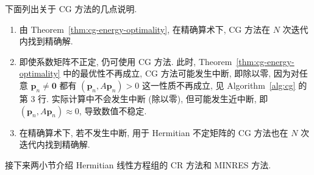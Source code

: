 {下面列出关于 CG 方法的几点说明.}
\begin{enumerate}
\item {由 Theorem\ \ref{thm:cg-energy-optimality}, 在精确算术下, CG 方法在 $N$ 次迭代内找到精确解.}
\item {即使系数矩阵不正定, 仍可使用 CG 方法. 此时, Theorem\ \ref{thm:cg-energy-optimality} 中的最优性不再成立, CG 方法可能发生中断, 即除以零, 因为对任意 $\bm p_n\ne\bm0$ 都有 $(\bm p_n,A\bm p_n)>0$ 这一性质不再成立, 见 Algorithm\ \ref{alg:cg} 的第 3 行. 实际计算中不会发生中断 (除以零), 但可能发生近中断, 即 $(\bm p_n,A\bm p_n)\approx0$, 导致数值不稳定.}
\item {在精确算术下, 若不发生中断, 用于 Hermitian 不定矩阵的 CG 方法也在 $N$ 次迭代内找到精确解.}
\end{enumerate}
{接下来两小节介绍 Hermitian 线性方程组的 CR 方法和 MINRES 方法.}
